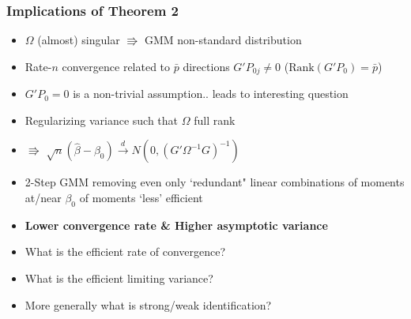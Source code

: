 \documentclass{beamer}
\begin{document}
    \begin{frame}
    \frametitle{Implications of Theorem 2}
  \begin{itemize}
  \item[]  $\Omega$ (almost)  singular  $\Rrightarrow$ GMM non-standard distribution
  \item[]   Rate-$n$ convergence  related to $\bar{p}$ directions $G'P_{0j}\neq0$ ($\textrm{Rank}(G'P_0)=\bar{p}$)
  \pause
  \vspace{10pt}

      \item[] $G'P_0=0$ is a non-trivial assumption.. leads to interesting question
       \vspace{8pt}
         \item[] Regularizing variance such that $\Omega$ full rank
          \item[] $\Rrightarrow$ $\sqrt{n}(\hat{\beta}-\beta_0)\overset{d}{\rightarrow} N(0,(G'\Omega^{-1}G)^{-1})$
          \vspace{9pt}
      \item[]  2-Step GMM removing  even only `redundant" linear combinations of moments at/near $\beta_0$ of moments `less' efficient
      \item[]\textbf{Lower convergence rate \& Higher asymptotic variance}


      \pause

          \vspace{9pt}
      \item[] What is the efficient rate of convergence?
      \item[] What is the efficient limiting variance?
      \item[] More generally what is strong/weak identification?
    \end{itemize}
    \end{frame}
\end{document}
